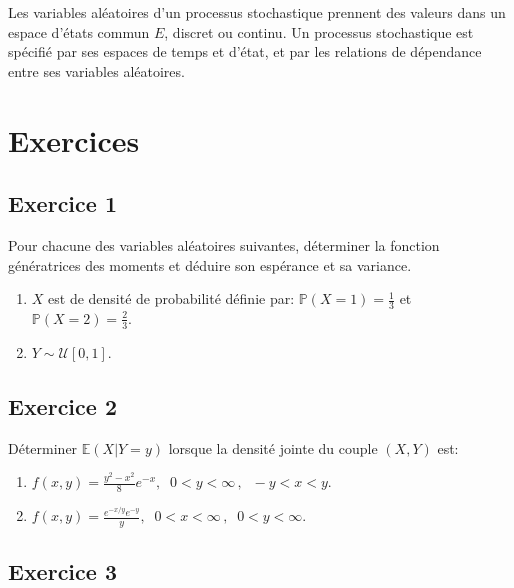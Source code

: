 \documentclass[
]{book}
\providecommand{\tightlist}{%
  \setlength{\itemsep}{0pt}\setlength{\parskip}{0pt}}
\theoremstyle{definition}
\theoremstyle{definition}
\theoremstyle{definition}
\theoremstyle{remark}
\begin{document}
Les variables aléatoires d'un processus stochastique prennent des valeurs dans un espace d'états commun \(E\), discret ou continu. Un processus stochastique est spécifié par ses espaces de temps et d'état, et par les relations de dépendance entre ses variables aléatoires.

\hypertarget{exercices}{%
\section*{Exercices}\label{exercices}}

\hypertarget{exercice-1}{%
\subsection*{Exercice 1}\label{exercice-1}}

Pour chacune des variables aléatoires suivantes, déterminer la fonction génératrices des moments et déduire son espérance et sa variance.

\begin{enumerate}
\def\labelenumi{\arabic{enumi}.}
\item
  \(X\) est de densité de probabilité définie par: \(\mathbb{P}(X=1)=\frac{1}{3}\) et \(\mathbb{P}(X=2)=\frac{2}{3}\).
\item
  \(Y \sim \mathcal{U}[0,1]\).
\end{enumerate}

\hypertarget{exercice-2}{%
\subsection*{Exercice 2}\label{exercice-2}}

Déterminer \(\mathbb{E}\left(X|Y=y \right)\) lorsque la densité jointe du couple \((X,Y)\) est:

\begin{enumerate}
\def\labelenumi{\roman{enumi})}
\tightlist
\item
  \(\displaystyle f(x,y)=\frac{y^2-x^2}{8}e^{-x},\;\; 0 < y < \infty\, , \;\; -y<x<y.\)
\item
  \(\displaystyle f(x,y)=\frac{e^{-x/y} e^{-y}}{y},\;\; 0 < x < \infty\, , \;\; 0<y<\infty.\)
\end{enumerate}

\hypertarget{exercice-3}{%
\subsection*{Exercice 3}\label{exercice-3}}
\end{document}
